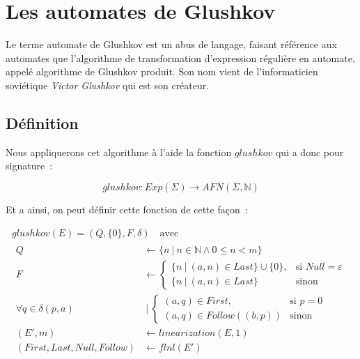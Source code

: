 \section{Les automates de Glushkov}\label{sec:glushkov}

Le terme \og{}automate de Glushkov\fg{} est un abus de langage, faisant
référence aux automates que l'algorithme de transformation d'expression
régulière en automate, appelé algorithme de Glushkov produit. Son nom vient de
l'informaticien soviétique \textit{Victor Glushkov} qui est son créateur.

\subsection{Définition}

Nous appliquerons cet algorithme à l'aide la fonction \(glushkov\) qui a donc
pour signature~:

\[
    glushkov: Exp(\Sigma) \to AFN(\Sigma, \mathbb{N})
\]

Et a ainsi, on peut définir cette fonction de cette façon~:

\begin{gather}
    glushkov     (E) = (Q, \{0\}, F, \delta) \quad \text{avec} \\
    \begin{align*}
        Q                                             & \leftarrow \{n ~|~ n \in \mathbb{N} \land 0 \leq n < m\}                                                                                               \\
        F                                             & \leftarrow \begin{cases} \{n ~|~ (a, n) \in Last\} \cup \{0\}, & \text{si } Null = \varepsilon \\ \{n ~|~ (a, n) \in Last\} & \text{sinon} \end{cases} \\
        \forall q                    \in \delta(p, a) & ~|~ \begin{cases} (a, q) \in First, & \text{si } p = 0 \\ (a, q) \in Follow((b, p)) & \text{sinon} \end{cases}                                         \\
        (E', m)                                       & \leftarrow linearization(E, 1)                                                                                                                         \\
        (First, Last, Null, Follow)                   & \leftarrow flnl(E')
    \end{align*}
\end{gather}

